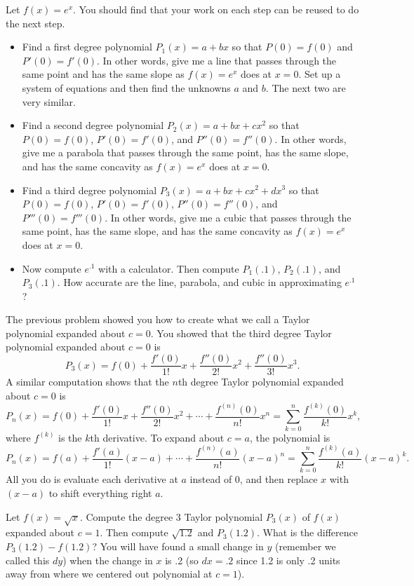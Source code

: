 \begin{problem} 
Let $f(x)=e^x$. You should find that your work on each step can be reused to do the next step.
\begin{itemize}
\item Find a first degree polynomial $P_1(x)=a+bx$ so that $P(0)=f(0)$ and $P'(0)=f'(0)$. In other words, give me a line that passes through the same point and has the same slope as $f(x)=e^x$ does at $x=0$. Set up a system of equations and then find the unknowns $a$ and $b$. The next two are very similar.
\item Find a second degree polynomial $P_2(x)=a+bx+cx^2$ so that $P(0)=f(0)$, $P'(0)=f'(0)$, and $P''(0)=f''(0)$. In other words, give me a parabola that passes through the same point, has the same slope, and has the same concavity as $f(x)=e^x$ does at $x=0$. 
\item Find a third degree polynomial $P_3(x)=a+bx+cx^2+dx^3$ so that $P(0)=f(0)$, $P'(0)=f'(0)$, $P''(0)=f''(0)$, and $P'''(0)=f'''(0)$. In other words, give me a cubic that passes through the same point, has the same slope, and has the same concavity as $f(x)=e^x$ does at $x=0$. 
\item Now compute $e^{.1}$ with a calculator.  Then compute $P_1(.1)$, $P_2(.1)$, and $P_3(.1)$. How accurate are the line, parabola, and cubic in approximating $e^{.1}$?
\end{itemize}
\end{problem} 

The previous problem showed you how to create what we call a Taylor polynomial expanded about $c=0$. You showed that the third degree Taylor polynomial expanded about $c=0$ is 
$$P_3(x) = f(0)+\frac{f'(0)}{1!}x+\frac{f''(0)}{2!}x^2+\frac{f''(0)}{3!}x^3. $$  
A similar computation shows that the $n$th degree Taylor polynomial expanded about $c=0$ is
$$P_n(x) = f(0)+\frac{f'(0)}{1!}x+\frac{f''(0)}{2!}x^2+\cdots +\frac{f^{(n)}(0)}{n!}x^n = \sum_{k=0}^n \frac{f^{(k)}(0)}{k!}x^k, $$
where $f^{(k)}$ is the $k$th derivative. To expand about $c=a$, the polynomial is 
$$P_n(x) = f(a)+\frac{f'(a)}{1!}(x-a)+\cdots +\frac{f^{(n)}(a)}{n!}(x-a)^n = \sum_{k=0}^n \frac{f^{(k)}(a)}{k!}(x-a)^k. $$ 
All you do is evaluate each derivative at $a$ instead of $0$, and then replace $x$ with $(x-a)$ to shift everything right $a$. 

\begin{problem}
Let $f(x)=\sqrt{x}$.  Compute the degree 3 Taylor polynomial $P_3(x)$ of $f(x)$ expanded about $c=1$. Then compute $\sqrt{1.2}$ and $P_3(1.2)$.  What is the difference $P_3(1.2)-f(1.2)$? 
You will have found a small change in $y$ (remember we called this $dy$) when the change in $x$ is .2 (so $dx=.2$ since 1.2 is only .2 units away from where we centered out polynomial at $c=1$).
\end{problem}

